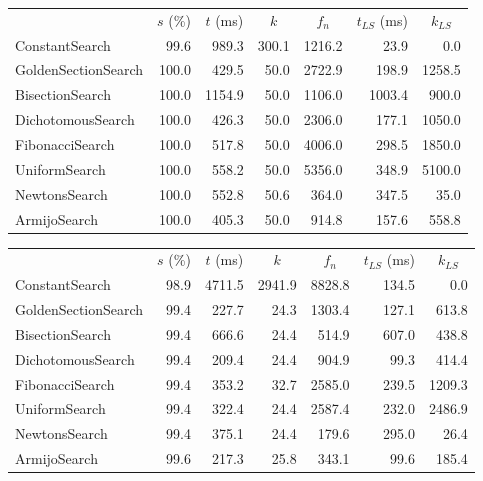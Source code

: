 \documentclass[a4paper,english,titlepage,12pt]{article}
\begin{document}
\begin{center}
\label{tab:performance_results_MSS_CGM}
\begin{tabular}{|l|r|r|r|r|r|r|}
\hline
\rowcolor{gray!25}
\multicolumn{1}{|c|}{Line Search Name} & \multicolumn{1}{c|}{$s$ (\%)} & \multicolumn{1}{c|}{$t$ (ms)} & \multicolumn{1}{c|}{$k$} & \multicolumn{1}{c|}{$f_n$} & \multicolumn{1}{c|}{$t_{LS}$ (ms)} & \multicolumn{1}{c|}{$k_{LS}$} \\
ConstantSearch & 99.6 & 989.3 & 300.1 & 1216.2 & 23.9 & 0.0 \\
GoldenSectionSearch & 100.0 & 429.5 & 50.0 & 2722.9 & 198.9 & 1258.5 \\
BisectionSearch & 100.0 & 1154.9 & 50.0 & 1106.0 & 1003.4 & 900.0 \\
DichotomousSearch & 100.0 & 426.3 & 50.0 & 2306.0 & 177.1 & 1050.0 \\
FibonacciSearch & 100.0 & 517.8 & 50.0 & 4006.0 & 298.5 & 1850.0 \\
UniformSearch & 100.0 & 558.2 & 50.0 & 5356.0 & 348.9 & 5100.0 \\
NewtonsSearch & 100.0 & 552.8 & 50.6 & 364.0 & 347.5 & 35.0 \\
ArmijoSearch & 100.0 & 405.3 & 50.0 & 914.8 & 157.6 & 558.8 \\
\hline
\end{tabular}
\end{center}

\begin{center}
\label{tab:performance_results_MSS_HBM}
\begin{tabular}{|l|r|r|r|r|r|r|}
\hline
\rowcolor{gray!25}
\multicolumn{1}{|c|}{Line Search Name} & \multicolumn{1}{c|}{$s$ (\%)} & \multicolumn{1}{c|}{$t$ (ms)} & \multicolumn{1}{c|}{$k$} & \multicolumn{1}{c|}{$f_n$} & \multicolumn{1}{c|}{$t_{LS}$ (ms)} & \multicolumn{1}{c|}{$k_{LS}$} \\
ConstantSearch & 98.9 & 4711.5 & 2941.9 & 8828.8 & 134.5 & 0.0 \\
GoldenSectionSearch & 99.4 & 227.7 & 24.3 & 1303.4 & 127.1 & 613.8 \\
BisectionSearch & 99.4 & 666.6 & 24.4 & 514.9 & 607.0 & 438.8 \\
DichotomousSearch & 99.4 & 209.4 & 24.4 & 904.9 & 99.3 & 414.4 \\
FibonacciSearch & 99.4 & 353.2 & 32.7 & 2585.0 & 239.5 & 1209.3 \\
UniformSearch & 99.4 & 322.4 & 24.4 & 2587.4 & 232.0 & 2486.9 \\
NewtonsSearch & 99.4 & 375.1 & 24.4 & 179.6 & 295.0 & 26.4 \\
ArmijoSearch & 99.6 & 217.3 & 25.8 & 343.1 & 99.6 & 185.4 \\
\hline
\end{tabular}
\end{center}
\end{document}
